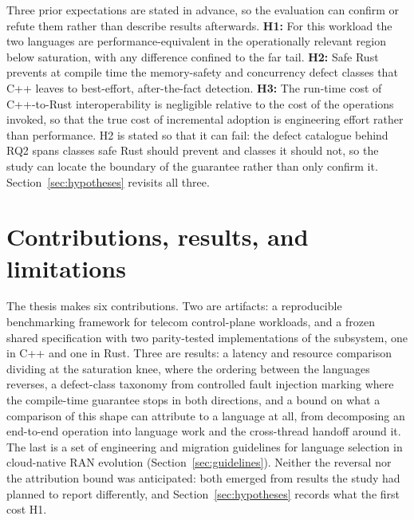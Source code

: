 Three prior expectations are stated in advance, so the evaluation can confirm or refute them
rather than describe results afterwards. \textbf{H1:} For this workload the two languages are
performance-equivalent in the operationally relevant region below saturation, with any difference
confined to the far tail. \textbf{H2:} Safe Rust prevents at compile time the memory-safety and
concurrency defect classes that C++ leaves to best-effort, after-the-fact detection.
\textbf{H3:} The run-time cost of C++-to-Rust interoperability is negligible relative to the cost
of the operations invoked, so that the true cost of incremental adoption is engineering effort
rather than performance. H2 is stated so that it can fail: the defect catalogue behind RQ2 spans
classes safe Rust should prevent and classes it should not, so the study can locate the boundary
of the guarantee rather than only confirm it. Section~\ref{sec:hypotheses} revisits all three.

\section{Contributions, results, and limitations}
The thesis makes six contributions. Two are artifacts: a reproducible benchmarking framework for
telecom control-plane workloads, and a frozen shared specification with two parity-tested
implementations of the subsystem, one in C++ and one in Rust. Three are results: a latency and
resource comparison dividing at the saturation knee, where the ordering between the languages
reverses, a defect-class taxonomy from controlled fault injection marking where the compile-time
guarantee stops in both directions, and a bound on what a comparison of this shape can attribute
to a language at all, from decomposing an end-to-end operation into language work and the
cross-thread handoff around it. The last is a set of engineering and migration guidelines for
language selection in cloud-native RAN evolution (Section~\ref{sec:guidelines}). Neither the
reversal nor the attribution bound was anticipated: both emerged from results the study had
planned to report differently, and Section~\ref{sec:hypotheses} records what the first cost H1.

